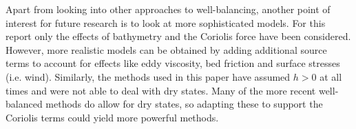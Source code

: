 Apart from looking into other approaches to well-balancing, another point of interest for future research is to look at more sophisticated models. For this report only the effects of bathymetry and the Coriolis force have been considered. However, more realistic models can be obtained by adding additional source terms to account for effects like eddy viscosity, bed friction and surface stresses (i.e. wind). Similarly, the methods used in this paper have assumed $h > 0$ at all times and were not able to deal with dry states. Many of the more recent well-balanced methods do allow for dry states, so adapting these to support the Coriolis terms could yield more powerful methods.